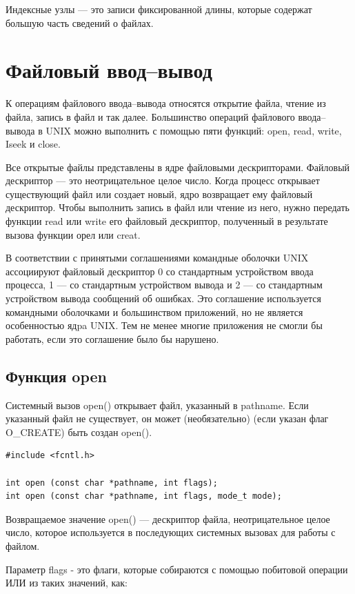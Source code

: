 Индексные узлы --- это записи фиксированной длины, которые содержат большую часть сведений о файлах.


\section{Файловый ввод--вывод}

К операциям файлового ввода--вывода относятся открытие файла, чтение из файла, запись в файл и так далее. Большинство операций файлового ввода--вывода в UNIX можно выполнить с помощью пяти функций: open, read, write, Iseek и close. 

Все открытые файлы представлены в ядре файловыми дескрипторами. Файловый дескриптор --- это неотрицательное целое число. Когда процесс открывает существующий файл или создает новый, ядро возвращает ему файловый дескриптор. Чтобы выполнить запись в файл или чтение из него, нужно передать функции read или write его файловый дескриптор, полученный в результате вызова функции орел или creat.

В соответствии с принятыми соглашениями командные оболочки UNIX ассоциируют файловый дескриптор 0 со стандартным устройством ввода процесса, 1 --- со стандартным устройством вывода и 2 --- со стандартным устройством вывода сообщений об ошибках. Это соглашение используется командными оболочками и большинством приложений, но не является особенностью ядpa UNIX. Тем не менее многие приложения не смогли бы работать, если это соглашение было бы нарушено.

\subsection{Функция open}

Системный вызов open() открывает файл, указанный в pathname. Если указанный файл не существует, он может (необязательно) (если указан флаг O\_CREATE) быть создан open().

\begin{lstlisting}[label=code:open,caption=Функция open]
#include <fcntl.h>

int open (const char *pathname, int flags);
int open (const char *pathname, int flags, mode_t mode);
\end{lstlisting}

Возвращаемое значение open() --- дескриптор файла, неотрицательное целое число, которое используется в последующих системных вызовах для работы с файлом.

Параметр flags - это флаги, которые собираются с помощью побитовой операции ИЛИ из таких значений, как:

